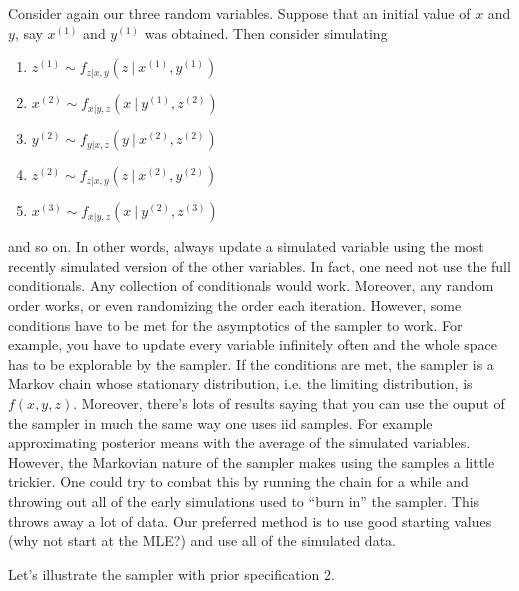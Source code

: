Consider again our three random variables. Suppose that an initial value of $x$ and $y$, say $x^(1)$ and $y^{(1)}$ was obtained. Then consider simulating 
\begin{enumerate}
\item $z^{(1)} \sim f_{z|x,y}(z ~|~ x^{(1)}, y^{(1)})$
\item $x^{(2)} \sim f_{x|y,z}(x ~|~ y^{(1)},z^{(2)})$
\item $y^{(2)} \sim f_{y|x,z}(y ~|~ x^{(2)}, z^{(2)})$
\item $z^{(2)} \sim f_{z|x,y}(z ~|~ x^{(2)}, y^{(2)})$
\item $x^{(3)} \sim f_{x|y,z}(x ~|~ y^{(2)}, z^{(3)})$
\end{enumerate}
and so on. In other words, always update a simulated variable using the most recently simulated
version of the other variables. In fact, one need not use the full conditionals. Any collection
of conditionals would work. Moreover, any random order works, or even randomizing the order
each iteration. However, some conditions have to be met for the asymptotics of the 
sampler to work. For example, you have to update every variable infinitely often and the
whole space has to be explorable by the sampler. If the conditions are met, the sampler
is a Markov chain whose stationary distribution, i.e. the limiting distribution, is 
$f(x, y, z)$. Moreover, there's lots of results saying that you can use the ouput of the
sampler in much the same way one uses iid samples. For example approximating posterior
means with the average of the simulated variables. However, the Markovian nature of the sampler
makes using the samples a little trickier. One could try to combat this by running the chain for a while and throwing out all of the early simulations used to ``burn in'' the sampler. This throws away
a lot of data. Our preferred method is to use good starting values (why not start at the MLE?)
and use all of the simulated data. 

Let's illustrate the sampler with prior specification 2.


